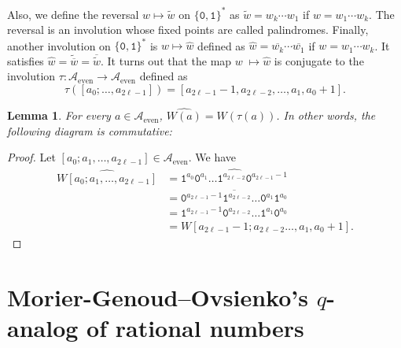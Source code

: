 \documentclass[a4paper,12pt]{amsart}
\newtheorem{lemma}[definition]{Lemma}
\newcommand{\Acal}{{\mathcal{A}}}
\newcommand{\0}{\mathtt{0}}
\newcommand{\1}{\mathtt{1}}
\newcommand{\2}{\mathtt{2}}
\newcommand{\3}{\mathtt{3}}
\newcommand{\Acaleven}{{\Acal_{\text{even}}}}
\begin{document}
Also, we define the reversal $w \mapsto \widetilde{w}$ on $\{\0,\1\}^*$ as
$\widetilde{w} = w_k \cdots w_1$ if $w = w_1 \cdots w_k$.
The reversal is an involution whose fixed points are called palindromes.
Finally, another involution on $\{\0,\1\}^*$ is $w \mapsto \widehat{w}$ defined as
$\widehat{w} = \overline{w_k} \cdots \overline{w_1}$ if $w = w_1 \cdots w_k$.
It satisfies $\widehat{w}
              =\widetilde{\overline{w}}
              =\overline{\widetilde{w}}$.
It turns out that the map $w\;\mapsto \widehat{w}$ is conjugate
to the involution $\tau:\Acaleven\to\Acaleven$ defined as
\[
    \tau([a_0;\dots,a_{2\ell-1}])=[a_{2\ell-1}-1,a_{2\ell-2},\dots,a_1,a_{0}+1].
\]

\begin{lemma}\label{lem:map-W-commutes-the-widehat}
    For every $a\in\Acaleven$, $\widehat{W(a)}=W(\tau(a))$.
    In other words, the following diagram is commutative:
\begin{center}
\end{center}
\end{lemma}

\begin{proof}
    Let $[a_0;a_1,\dots,a_{2\ell-1}]\in\Acaleven$.
    We have
    \begin{align*}
    \widehat{W[a_0;a_1,\dots,a_{2\ell-1}]}
        &=\widehat{\1^{a_0}\0^{a_1}\dots \1^{a_{2\ell-2}}\0^{a_{2\ell-1}-1}}\\
        &=\overline{\0^{a_{2\ell-1}-1} \1^{a_{2\ell-2}}\dots\0^{a_1}\1^{a_0}}\\
        &=\1^{a_{2\ell-1}-1} \0^{a_{2\ell-2}}\dots\1^{a_1}\0^{a_0}\\
        &=W[a_{2\ell-1}-1;a_{2\ell-2}\dots,a_1,a_0+1].
    \end{align*}
\end{proof}





\section{Morier-Genoud--Ovsienko's \texorpdfstring{$q$}{q}-analog of rational numbers}
\label{sec:Morier-Genoud-Ovsienko-q-analog}
\end{document}
